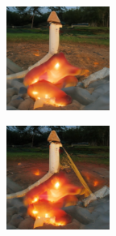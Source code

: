 \documentclass{article}
\begin{document}
\begin{figure}
\begin{subfigure}[b]{0.5\linewidth}
\begin{subfigure}[b]{0.242\linewidth}
        \end{subfigure}
        \begin{subfigure}[b]{0.242\linewidth}
        \includegraphics[width=\linewidth]{figures/imagenet128/solver_samples/imagenet128_fm_ot_203_20.png}
        \end{subfigure}
        \begin{subfigure}[b]{0.242\linewidth}
        \includegraphics[width=\linewidth]{figures/imagenet128/solver_samples/imagenet128_fm_ot_203_50.png}
        \end{subfigure}
    \end{subfigure}\\
    

\end{figure}
\end{document}

